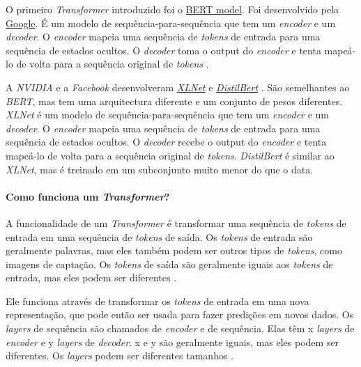 O primeiro \textit{Transformer} introduzido foi o \href{https://arxiv.org/abs/1810.04805}{BERT model}. Foi desenvolvido pela \href{https://www.google.com/}{Google}. É um modelo de sequência-para-sequência que tem um \textit{encoder} e um \textit{decoder}. O \textit{encoder} mapeia uma sequência de \textit{tokens} de entrada para uma sequência de estados ocultos. O \textit{decoder} toma o output do \textit{encoder} e tenta mapeá-lo de volta para a sequência original de \textit{tokens} \cite{yt2}.

A \textit{NVIDIA} e a \textit{Facebook} desenvolveram \href{https://arxiv.org/abs/1906.08237}{\textit{XLNet}} e \href{https://arxiv.org/abs/1810.04805}{\textit{DistilBert}} \cite{yt2}. São semelhantes ao \textit{BERT}, mas tem uma arquitectura diferente e um conjunto de pesos diferentes. \textit{XLNet} é um modelo de sequência-para-sequência que tem um \textit{encoder} e um \textit{decoder}. O \textit{encoder} mapeia uma sequência de \textit{tokens} de entrada para uma sequência de estados ocultos. O \textit{decoder} recebe o output do \textit{encoder} e tenta mapeá-lo de volta para a sequência original de \textit{tokens}. \textit{DistilBert} é similar ao \textit{XLNet}, mas é treinado em um subconjunto muito menor do que o data.

\paragraph{Como funciona um \textit{Transformer}?\\}

A funcionalidade de um \textit{Transformer} é transformar uma sequência de \textit{tokens} de entrada em uma sequência de \textit{tokens} de saída. Os \textit{tokens} \cite{mtf1} \cite{mtf2} de entrada são geralmente palavras, mas eles também podem ser outros tipos de \textit{tokens}, como imagens de captação. Os \textit{tokens} de saída são geralmente iguais aos \textit{tokens} de entrada, mas eles podem ser diferentes \cite{hf1}.

Ele funciona através de transformar os \textit{tokens} de entrada em uma nova representação, que pode então ser usada para fazer predições em novos dados. Os \textit{layers} de sequência são chamados de \textit{encoder} \cite{mtf1} e de sequência. Elas têm x \textit{layers} de \textit{encoder} e y \textit{layers} de \textit{decoder}. x e y são geralmente iguais, mas eles podem ser diferentes. Os \textit{layers} podem ser diferentes tamanhos \cite{hf1}.

